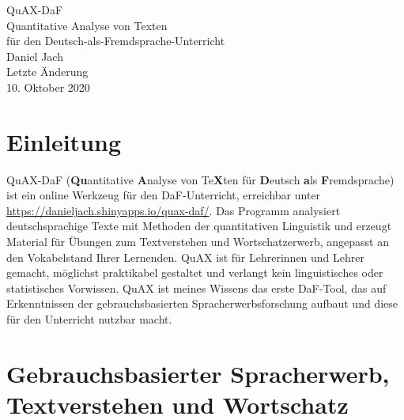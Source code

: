 \documentclass[11pt]{article}\usepackage[]{graphicx}\usepackage[]{color}
\begin{document}










\thispagestyle{empty}


  \begin{titlepage}
    \vspace*{\fill}
    \begin{center}
      {\Huge QuAX-DaF}\\[0.5cm]
      {\Large Quantitative Analyse von Texten\\für den Deutsch-als-Fremdsprache-Unterricht}\\[2cm]
      {\Large Daniel Jach}\\[2cm]
      Letzte Änderung\\10. Oktober 2020\\[2cm]
    \end{center}
    \vspace*{\fill}
  \end{titlepage}






\newpage

\section{Einleitung}

QuAX-DaF (\textbf{Qu}antitative \textbf{A}nalyse von Te\textbf{X}ten für \textbf{D}eutsch \textbf{a}ls \textbf{F}remdsprache) ist ein online Werkzeug für den DaF-Unterricht, erreichbar unter \href{https://danieljach.shinyapps.io/quax-daf/}{https://danieljach.shinyapps.io/quax-daf/}. Das Programm analysiert deutschsprachige Texte mit Methoden der quantitativen Linguistik und erzeugt Material für Übungen zum Textverstehen und Wortschatzerwerb, angepasst an den Vokabelstand Ihrer Lernenden. QuAX ist für Lehrerinnen und Lehrer gemacht, möglichst praktikabel gestaltet und verlangt kein linguistisches oder statistisches Vorwissen. QuAX ist meines Wissens das erste DaF-Tool, das auf Erkenntnissen der gebrauchsbasierten Spracherwerbsforschung aufbaut und diese für den Unterricht nutzbar macht. 

\section{Gebrauchsbasierter Spracherwerb, Textverstehen und Wortschatz}
\end{document}
